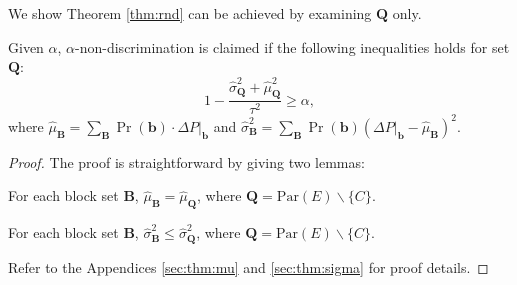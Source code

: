 \documentclass[twoside,leqno,twocolumn]{article}
\begin{document}
We show Theorem \ref{thm:rnd} can be achieved by examining $\mathbf{Q}$ only.
\begin{theorem}\label{thm:srnd}
Given $\alpha$, $\alpha$-non-discrimination is claimed if the following inequalities holds for set $\mathbf{Q}$:
\begin{equation*}
1-\frac{\hat{\sigma}_{\mathbf{Q}}^{2}+\hat{\mu}_{\mathbf{Q}}^{2}}{\tau^{2}} \geq \alpha,
\end{equation*}
where $\hat{\mu}_{\mathbf{B}}=\sum_{\mathbf{B}}\Pr(\mathbf{b})\cdot \Delta P|_{\mathbf{b}}$ and $\hat{\sigma}_{\mathbf{B}}^{2}=\sum_{\mathbf{B}}\Pr(\mathbf{b})(\Delta P|_{\mathbf{b}}-\hat{\mu}_{\mathbf{B}})^{2}$.
\end{theorem}

\begin{proof}
The proof is straightforward by giving two lemmas:
\begin{lemma}\label{thm:mu}
For each block set $\mathbf{B}$, $\hat{\mu}_{\mathbf{B}}=\hat{\mu}_{\mathbf{Q}}$, where $\mathbf{Q}=\mathrm{Par}(E)\backslash \{C\}$.
\end{lemma}
\begin{lemma}\label{thm:sigma}
For each block set $\mathbf{B}$, $\hat{\sigma}_{\mathbf{B}}^{2}\leq \hat{\sigma}_{\mathbf{Q}}^{2}$, where $\mathbf{Q}=\mathrm{Par}(E)\backslash \{C\}$.
\end{lemma}
Refer to the Appendices \ref{sec:thm:mu} and \ref{sec:thm:sigma} for proof details.
\end{proof}

\end{document}
